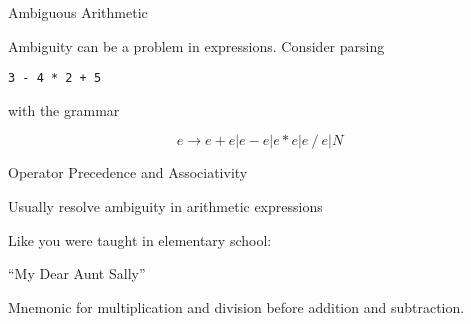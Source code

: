 \documentclass{plt}
\def\plus#1#2{node {\texttt{+}} child {#1} child {#2}}
\def\minus#1#2{node {\texttt{-}} child {#1} child {#2}}
\def\mult#1#2{node {\texttt{*}} child {#1} child {#2}}
\def\lit#1{node {#1}}
\begin{document}
\begin{frame}{Ambiguous Arithmetic}

Ambiguity can be a problem in expressions.  Consider parsing

\begin{center}
\texttt{3 - 4 * 2 + 5}
\end{center}

with the grammar

\[e \rightarrow  e + e | e - e | e * e | e \mathop{/} e | N\]

\ttfamily

\hfil
{}
\hfil
{}
\hfil
{}


\end{frame}

\begin{frame}{Operator Precedence and Associativity}

Usually resolve ambiguity in arithmetic expressions

Like you were taught in elementary school:

``My Dear Aunt Sally''

Mnemonic for multiplication and division before addition and subtraction.

\end{frame}
\end{document}
